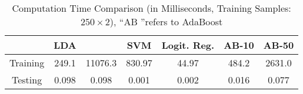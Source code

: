 \begin{table}
\begin{center}
\caption{Computation Time Comparison (in Milliseconds, Training Samples: $250\times 2$), ``AB ''refers to AdaBoost}
\label{tab:time-consuming}
\begin{tabular}{*{7}{c}}
\toprule
	&LDA&\TheName\ &SVM&Logit. Reg. & AB-10 & AB-50\\
	\midrule

Training  &	249.1	&  11076.3  &  830.97  &  44.97  &  484.2 & 2631.0  \\
\midrule

Testing   &	0.098	&  0.098   &  0.001    &  0.002  &  0.016 & 0.077  \\

\bottomrule
\end{tabular}
\end{center}
\end{table}


